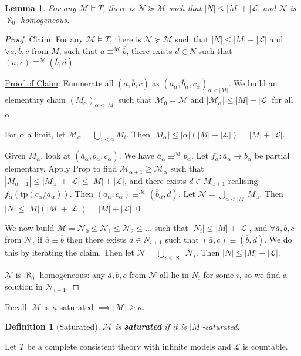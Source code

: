 \documentclass[]{article}
\theoremstyle{custhm}
\theoremstyle{cusdef}
\newtheorem{defin}[theorem]{Definition}
\theoremstyle{custhm}
\newtheorem{lemma}[theorem]{Lemma}
\theoremstyle{custhm}
\theoremstyle{custhm}
\theoremstyle{ex}
\theoremstyle{custhm}
\theoremstyle{cusdef}
\theoremstyle{remark}
\theoremstyle{remark}
\newcommand{\ra}{\rightarrow}
\newcommand{\undf}[1]{\textit{\textbf{#1}}}
\renewcommand{\L}{\mathcal{L}}
\newcommand{\M}{\mathcal{M}}
\renewcommand{\bar}{\overline}
\newcommand{\tp}{\textrm{tp}}
\newcommand{\N}{\mathcal{N}}
\begin{document}
\begin{lemma}
For any $\M\models T$, there is $\N\succeq\M$ such that $|N|\le |M| + |\L|$ and $\N$ is $\aleph_0$-homogeneous.
\end{lemma}
\begin{proof}
\underline{Claim}: For any $\M\models T$, there is $\N\succeq \M$ such that $|N|\le |M|+|\L|$ and $\forall \bar{a},\bar{b},c$ from $M$, such that $\bar{a}\equiv^\M\bar{b}$, there exists $d\in N$ such that $(\bar{a},c) \equiv^\N(\bar{b},d)$.

\underline{Proof of Claim}: Enumerate all $(\bar{a},\bar{b},c)$ as $(\bar{a}_\alpha,\bar{b}_\alpha,c_\alpha)_{\alpha < |M|}$. We build an elementary chain $(M_\alpha)_{\alpha < |M|}$ such that $\M_0 = \M$ and $|\M_\alpha| \le |M| + |\L|$ for all $\alpha$.

For $\alpha$ a limit, let $\M_\alpha = \bigcup_{i<\alpha}M_i$. Then $|M_\alpha| \le |\alpha|(|M|+|\L|) = |M| + |\L|$.

Given $M_\alpha$, look at $(\bar{a}_\alpha,\bar{b}_\alpha,c_\alpha)$. We have $\bar{a}_\alpha \equiv^\M\bar{b}_\alpha$. Let $f_\alpha : \bar{a}_\alpha \ra \bar{b}_\alpha$ be partial elementary. Apply Prop to find $\M_{\alpha+1} \ge \M_\alpha$ such that $|M_{\alpha+1}|\le |M_\alpha| + |\L| \le |M| + |\L|$, and there exists $d \in M_{\alpha+1}$ realising $f_\alpha(\tp(c_\alpha/\bar{a}_\alpha))$. Then $(\bar{a}_\alpha,c_\alpha) \equiv^\M(\bar{b}_\alpha,d)$. Let $\N = \bigcup_{\alpha < |M|}M_\alpha$. Then $|N| \le |M|(|M|+|\L|) = |M| + |\L|$.\qed

We now build $\M = \N_0 \le \N_1\le \N_2\le \dots$ such that $|N_i| \le |M|+|\L|$, and $\forall \bar{a},\bar{b},c$ from $\N_i$ if $\bar{a}\equiv \bar{b}$ then there exists $d\in N_{i+1}$ such that $(\bar{a},c) \equiv (\bar{b},d)$. We do this by iterating the claim. Then let $\N = \bigcup_{i<\aleph_0}\N_i$. Then $|N|\le |M| + |\L|$.

$\N$ is $\aleph_0$-homogeneous: any $\bar{a},\bar{b},c$ from $\N$ all lie in $N_i$ for some $i$, so we find a solution in $\N_{i+1}$.
\end{proof}

\underline{Recall}: $\M$ is $\kappa$-saturated $\implies |\M| \ge \kappa$.

\begin{defin}[Saturated]
$\M$ is \undf{saturated} if it is $|M|$-saturated.
\end{defin}

Let $T$ be a complete consistent theory with infinite models and $\L$ is countable.
\end{document}
